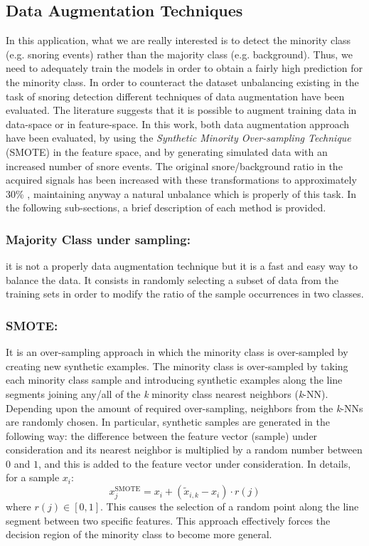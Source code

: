 \subsection{Data Augmentation Techniques}
\label{ssec:data-augmentation}
In this application, what we are really interested is to detect the minority class (e.g. snoring events) rather than the majority class (e.g. background). Thus, we need to adequately train the models in order to obtain a fairly high prediction for the minority class. In order to counteract the dataset unbalancing existing in the task of snoring detection different techniques of data augmentation have been evaluated. 
The literature suggests that it is possible to augment training data in data-space or in feature-space. 
In this work, both data augmentation approach have been evaluated, by using the \emph{Synthetic Minority Over-sampling Technique} (SMOTE) \cite{chawla2002smote} in the feature space, and by generating simulated data with an increased number of snore events. 
The original snore/background ratio in the acquired signals has been increased with these transformations to approximately 30\% \cite{young1997nasal}, maintaining anyway a natural unbalance which is properly of this task.
In the following sub-sections, a brief description of each method is provided.

\subsubsection{Majority Class under sampling:} it is not a properly data augmentation technique but it is a fast and easy way to balance the data. It consists in randomly selecting a subset of data from the training sets in order to modify the ratio of the sample occurrences in two classes.

\subsubsection{SMOTE:} It is an over-sampling approach in which the minority class is over-sampled by creating new synthetic examples. The minority class is over-sampled by taking each minority class sample and introducing synthetic examples along the line segments joining any/all of the \emph{k} minority class nearest neighbors (\emph{k}-NN). Depending upon the amount of required over-sampling, neighbors from the \emph{k}-NNs are randomly chosen. In particular, synthetic samples are generated in the following way: the difference between the feature vector (sample) under consideration and its nearest neighbor is multiplied by a random number between $0$ and $1$, and this is added to the feature vector under consideration. In details, for a sample $x_{i}$:
\begin{equation}
x_{j}^{\text{SMOTE}} = x_{i} + (\tilde{x}_{i,k} - x_{i}) \cdot r(j)
\end{equation}
where $r(j) \in [0,1]$.
This causes the selection of a random point along the line segment between two specific features. This approach effectively forces the decision region of the minority class to become more general. 

